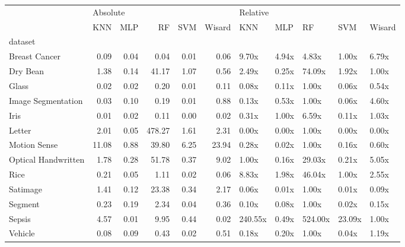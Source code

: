 \begin{tabular}{lrrrrrlllll}
\toprule
{} & \multicolumn{5}{l}{Absolute} & \multicolumn{5}{l}{Relative} \\
{} &      KNN &  MLP &     RF &  SVM & Wisard &      KNN &    MLP &       RF &     SVM & Wisard \\
dataset             &          &      &        &      &        &          &        &          &         &        \\
\midrule
Breast Cancer       &     0.09 & 0.04 &   0.04 & 0.01 &   0.06 &    9.70x &  4.94x &    4.83x &   1.00x &  6.79x \\
Dry Bean            &     1.38 & 0.14 &  41.17 & 1.07 &   0.56 &    2.49x &  0.25x &   74.09x &   1.92x &  1.00x \\
Glass               &     0.02 & 0.02 &   0.20 & 0.01 &   0.11 &    0.08x &  0.11x &    1.00x &   0.06x &  0.54x \\
Image Segmentation  &     0.03 & 0.10 &   0.19 & 0.01 &   0.88 &    0.13x &  0.53x &    1.00x &   0.06x &  4.60x \\
Iris                &     0.01 & 0.02 &   0.11 & 0.00 &   0.02 &    0.31x &  1.00x &    6.59x &   0.11x &  1.03x \\
Letter              &     2.01 & 0.05 & 478.27 & 1.61 &   2.31 &    0.00x &  0.00x &    1.00x &   0.00x &  0.00x \\
Motion Sense        &    11.08 & 0.88 &  39.80 & 6.25 &  23.94 &    0.28x &  0.02x &    1.00x &   0.16x &  0.60x \\
Optical Handwritten &     1.78 & 0.28 &  51.78 & 0.37 &   9.02 &    1.00x &  0.16x &   29.03x &   0.21x &  5.05x \\
Rice                &     0.21 & 0.05 &   1.11 & 0.02 &   0.06 &    8.83x &  1.98x &   46.04x &   1.00x &  2.55x \\
Satimage            &     1.41 & 0.12 &  23.38 & 0.34 &   2.17 &    0.06x &  0.01x &    1.00x &   0.01x &  0.09x \\
Segment             &     0.23 & 0.19 &   2.34 & 0.04 &   0.36 &    0.10x &  0.08x &    1.00x &   0.02x &  0.15x \\
Sepsis              &     4.57 & 0.01 &   9.95 & 0.44 &   0.02 &  240.55x &  0.49x &  524.00x &  23.09x &  1.00x \\
Vehicle             &     0.08 & 0.09 &   0.43 & 0.02 &   0.51 &    0.18x &  0.20x &    1.00x &   0.04x &  1.19x \\

\end{tabular}
